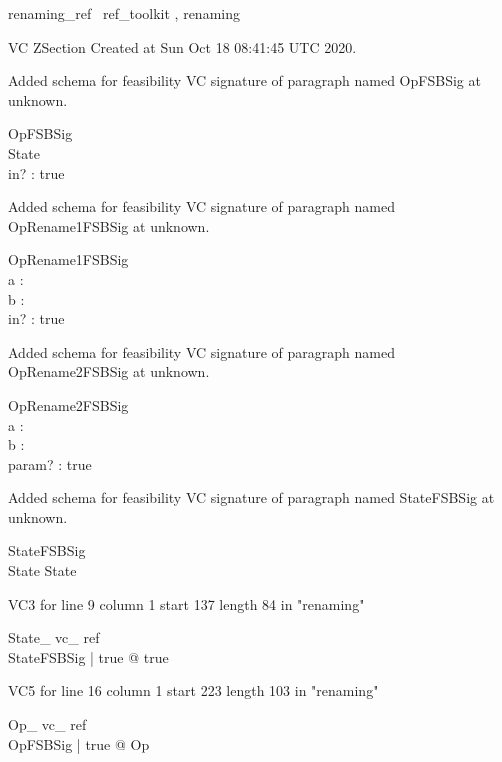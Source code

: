 \documentclass{article}
\begin{document}

\begin{zsection}	 \SECTION renaming\_ref \parents~ref\_toolkit , renaming
\end{zsection}

VC ZSection Created at Sun Oct 18 08:41:45 UTC 2020.


Added schema for feasibility VC signature of paragraph named OpFSBSig at unknown.
\begin{schema}{OpFSBSig}
\\
 State \\
 in? : \nat 
\where
 true
\end{schema}


Added schema for feasibility VC signature of paragraph named OpRename1FSBSig at unknown.
\begin{schema}{OpRename1FSBSig}
\\
 a : \nat \\
 b : \power \nat \\
 in? : \nat 
\where
 true
\end{schema}


Added schema for feasibility VC signature of paragraph named OpRename2FSBSig at unknown.
\begin{schema}{OpRename2FSBSig}
\\
 a : \nat \\
 b : \power \nat \\
 param? : \nat 
\where
 true
\end{schema}


Added schema for feasibility VC signature of paragraph named StateFSBSig at unknown.
\begin{schema}{StateFSBSig}
\\
 State 
\where
 State
\end{schema}

VC3 for line 9 column 1 start 137 length 84 in "renaming"
\begin{theorem}{ State\_ vc\_ ref}\\
 \exists StateFSBSig | true @ true \\

\end{theorem}

VC5 for line 16 column 1 start 223 length 103 in "renaming"
\begin{theorem}{ Op\_ vc\_ ref}\\
 \forall OpFSBSig | true @ \pre Op \\

\end{theorem}
\end{document}
